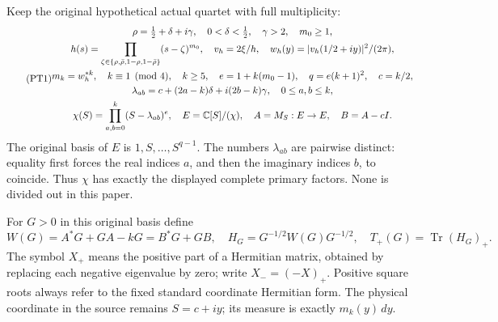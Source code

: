 \documentclass[11pt,a4paper]{article}
\providecommand{\Tr}{\operatorname{Tr}}
\begin{document}
Keep the original hypothetical actual quartet with full multiplicity:
\begin{equation}\tag{PT1}
\begin{gathered}
 \rho=\tfrac12+\delta+i\gamma,\quad
 0<\delta<\tfrac12,\quad\gamma>2,\quad m_0\ge1,\\
 h(s)=\prod_{\zeta\in\{\rho,\bar\rho,1-\rho,1-\bar\rho\}}
                     (s-\zeta)^{m_0},\quad
 v_h=2\xi/h,\quad w_h(y)=|v_h(1/2+iy)|^2/(2\pi),\\
 m_k=w_h^{*k},\quad k\equiv1\pmod4,\quad k\ge5,\quad
 e=1+k(m_0-1),\quad q=e(k+1)^2,\quad c=k/2,\\
 \lambda_{ab}=c+(2a-k)\delta+i(2b-k)\gamma,\quad0\le a,b\le k,\\
 \chi(S)=\prod_{a,b=0}^k(S-\lambda_{ab})^e,\quad
 E=\mathbb C[S]/(\chi),\quad A=M_S:E\to E,\quad B=A-cI.
\end{gathered}
\end{equation}
The original basis of \(E\) is \(1,S,\ldots,S^{q-1}\).
The numbers \(\lambda_{ab}\) are pairwise distinct: equality first
forces the real indices \(a\), and then the imaginary indices \(b\),
to coincide. Thus \(\chi\) has exactly the displayed complete primary
factors. None is divided out in this paper.

For \(G>0\) in this original basis define
\begin{equation}\tag{PT2}
 W(G)=A^*G+GA-kG=B^*G+GB,\quad
 H_G=G^{-1/2}W(G)G^{-1/2},\quad
 T_+(G)=\Tr(H_G)_+.
\end{equation}
The symbol \(X_+\) means the positive part of a Hermitian matrix,
obtained by replacing each negative eigenvalue by zero; write
\(X_-=(-X)_+\). Positive square roots always refer to the fixed
standard coordinate Hermitian form. The physical coordinate in the
source remains \(S=c+iy\); its measure is exactly \(m_k(y)\,dy\).
\end{document}
